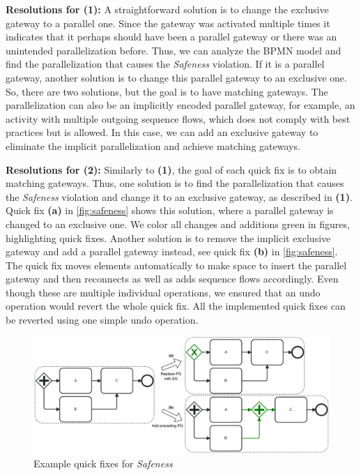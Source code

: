 \documentclass[runningheads]{llncs}
\begin{document}
\textbf{Resolutions for (1):} A straightforward solution is to change the exclusive gateway to a parallel one.
Since the gateway was activated multiple times it indicates that it perhaps should have been a parallel gateway or there was an unintended parallelization before.
Thus, we can analyze the BPMN model and find the parallelization that causes the \textit{Safeness} violation.
If it is a parallel gateway, another solution is to change this parallel gateway to an exclusive one.
So, there are two solutions, but the goal is to have matching gateways.
The parallelization can also be an implicitly encoded parallel gateway, for example, an activity with multiple outgoing sequence flows, which does not comply with best practices but is allowed.
In this case, we can add an exclusive gateway to eliminate the implicit parallelization and achieve matching gateways.

\textbf{Resolutions for (2):} Similarly to \textbf{(1)}, the goal of each quick fix is to obtain matching gateways.
Thus, one solution is to find the parallelization that causes the \textit{Safeness} violation and change it to an exclusive gateway, as described in \textbf{(1)}.
Quick fix \textbf{(a)} in \autoref{fig:safeness} shows this solution, where a parallel gateway is changed to an exclusive one.
We color all changes and additions green in figures, highlighting quick fixes.
Another solution is to remove the implicit exclusive gateway and add a parallel gateway instead, see quick fix \textbf{(b)} in \autoref{fig:safeness}.
The quick fix moves elements automatically to make space to insert the parallel gateway and then reconnects as well as adds sequence flows accordingly.
Even though these are multiple individual operations, we ensured that an undo operation would revert the whole quick fix.
All the implemented quick fixes can be reverted using one simple undo operation.

\begin{figure}[ht]
	\centering
	\includegraphics[width=1\textwidth]{images/safeness}
	\caption{Example quick fixes for \textit{Safeness}}
	\label{fig:safeness}
\end{figure}
\end{document}
